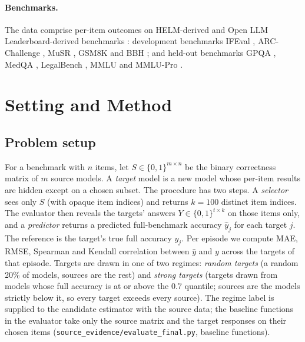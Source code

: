 \documentclass{article}
\begin{document}
\paragraph{Benchmarks.} The data comprise per-item outcomes on HELM-derived and Open LLM Leaderboard-derived benchmarks \citep{Liang2022HolisticEO}: development benchmarks IFEval \citep{Zhou2023InstructionFollowingEF}, ARC-Challenge \citep{Clark2018ThinkYH}, MuSR \citep{Sprague2023MuSRTT}, GSM8K \citep{Cobbe2021TrainingVT} and BBH \citep{Suzgun2022ChallengingBT}; and held-out benchmarks GPQA \citep{Rein2023GPQAAG}, MedQA \citep{Jin2020WhatDD}, LegalBench \citep{Guha2023LegalBenchAC}, MMLU \citep{Hendrycks2020MeasuringMM} and MMLU-Pro \citep{Wang2024MMLUProAM}.

\section{Setting and Method}
\label{sec:method}
\subsection{Problem setup}
For a benchmark with $n$ items, let $S\in\{0,1\}^{m\times n}$ be the binary correctness matrix of $m$ source models. A \emph{target} model is a new model whose per-item results are hidden except on a chosen subset. The procedure has two steps. A \emph{selector} sees only $S$ (with opaque item indices) and returns $k{=}100$ distinct item indices. The evaluator then reveals the targets' answers $Y\in\{0,1\}^{t\times k}$ on those items only, and a \emph{predictor} returns a predicted full-benchmark accuracy $\hat y_j$ for each target $j$. The reference is the target's true full accuracy $y_j$. Per episode we compute MAE, RMSE, Spearman and Kendall correlation between $\hat y$ and $y$ across the targets of that episode. Targets are drawn in one of two regimes: \emph{random targets} (a random 20\% of models, sources are the rest) and \emph{strong targets} (targets drawn from models whose full accuracy is at or above the 0.7 quantile; sources are the models strictly below it, so every target exceeds every source). The regime label is supplied to the candidate estimator with the source data; the baseline functions in the evaluator take only the source matrix and the target responses on their chosen items (\texttt{source\_evidence/evaluate\_final.py}, baseline functions).
\end{document}
